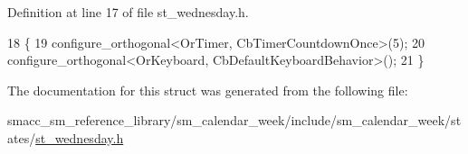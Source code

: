 Definition at line 17 of file st\+\_\+wednesday.\+h.


\begin{DoxyCode}
18     \{
19         configure\_orthogonal<OrTimer,  CbTimerCountdownOnce>(5);    
20         configure\_orthogonal<OrKeyboard, CbDefaultKeyboardBehavior>();
21     \}
\end{DoxyCode}


The documentation for this struct was generated from the following file\+:\begin{DoxyCompactItemize}
\item 
smacc\+\_\+sm\+\_\+reference\+\_\+library/sm\+\_\+calendar\+\_\+week/include/sm\+\_\+calendar\+\_\+week/states/\hyperlink{sm__calendar__week_2include_2sm__calendar__week_2states_2st__wednesday_8h}{st\+\_\+wednesday.\+h}\end{DoxyCompactItemize}
